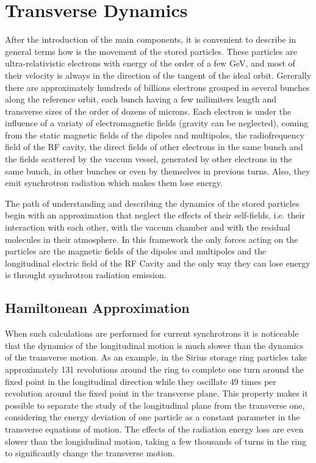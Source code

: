 \documentclass[
	12pt,				%
	openright,			%
	oneside,			%
	a4paper,		%
	chapter=TITLE,		%
	section=TITLE,		%
    brazil,				%
	english,			%
	sumario=tradicional,
	]{abntex2}
\begin{document}
  \section{Transverse Dynamics}

  After the introduction of the main components, it is convenient to describe in general terms how is the movement of the stored particles. These particles are ultra-relativistic electrons with energy of the order of a few \si{GeV}, and most of their velocity is always in the direction of the tangent of the ideal orbit. Gererally there are approximately hundreds of billions electrons grouped in several bunches along the reference orbit, each bunch having a few milimiters length and transverse sizes of the order of dozens of microns. Each electron is under the influence of a variaty of electromagnetic fields (gravity can be neglected), coming from the static magnetic fields of the dipoles and multipoles, the radiofrequency field of the RF cavity, the direct fields of other electrons in the same bunch and the fields scattered by the vaccum vessel, generated by other electrons in the same bunch, in other bunches or even by themselves in previous turns. Also, they emit synchrotron radiation which makes them lose energy.

  The path of understanding and describing the dynamics of the stored particles begin with an approximation that neglect the effects of their self-fields, i.e. their interaction with each other, with the vaccum chamber and with the residual molecules in their atmosphere. In this framework the only forces acting on the particles are the magnetic fields of the dipoles and multipoles and the longitudinal electric field of the RF Cavity and the only way they can lose energy is throught synchrotron radiation emission.

    \subsection{Hamiltonean Approximation}

    When such calculations are performed for current synchrotrons it is noticeable that the dynamics of the longitudinal motion is much slower than the dynamics of the transverse motion. As an example, in the Sirius storage ring particles take approximately 131 revolutions around the ring to complete one turn around the fixed point in the longitudinal direction while they oscillate 49 times per revolution around the fixed point in the transverse plane. This property makes it possible to separate the study of the longitudinal plane from the transverse one, considering the energy deviation of one particle as a constant parameter in the transverse equations of motion. The effects of the radiation energy loss are even slower than the longidudinal motion, taking a few thousands of turns in the ring to significantly change the transverse motion.
\end{document}
